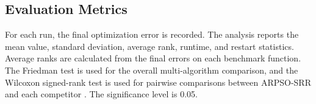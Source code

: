 \documentclass[conference]{IEEEtran}
\begin{document}
\begin{table}[!t]
    \caption{Experimental Parameter Settings}
    \centering
    \footnotesize
    \setlength{\tabcolsep}{2.5pt}
    \label{tab:parameters}
\end{table}

\subsection{Evaluation Metrics}
For each run, the final optimization error is recorded. The analysis reports the mean value, standard deviation, average rank, runtime, and restart statistics. Average ranks are calculated from the final errors on each benchmark function. The Friedman test is used for the overall multi-algorithm comparison, and the Wilcoxon signed-rank test is used for pairwise comparisons between ARPSO-SRR and each competitor \cite{b8,b9,b10}. The significance level is 0.05.
\end{document}
